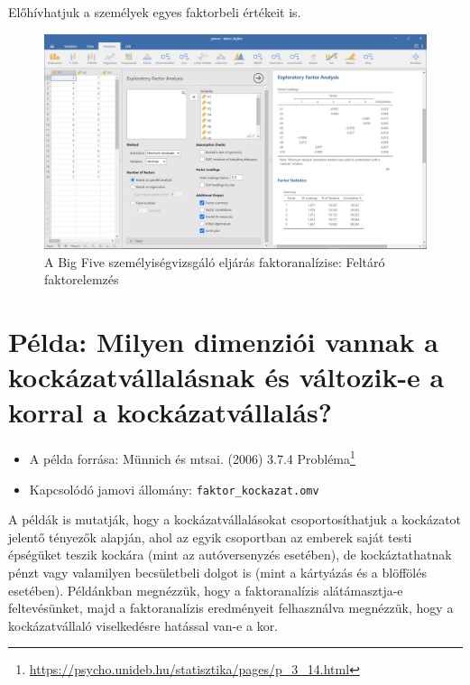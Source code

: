 \documentclass[
  letterpaper,
]{krantz}
\providecommand{\tightlist}{%
  \setlength{\itemsep}{0pt}\setlength{\parskip}{0pt}}\usepackage{longtable,booktabs,array}
\renewcommand{\href}[2]{#2\footnote{\url{#1}}}
\begin{document}
Előhívhatjuk a személyek egyes faktorbeli értékeit is.

\begin{figure}

{\centering \includegraphics{./images/faktor_bigfive_kep_01.jpg}

}

\caption{A Big Five személyiségvizsgáló eljárás faktoranalízise: Feltáró
faktorelemzés}

\end{figure}

\hypertarget{puxe9lda-milyen-dimenziuxf3i-vannak-a-kockuxe1zatvuxe1llaluxe1snak-uxe9s-vuxe1ltozik-e-a-korral-a-kockuxe1zatvuxe1llaluxe1s}{%
\section{Példa: Milyen dimenziói vannak a kockázatvállalásnak és
változik-e a korral a
kockázatvállalás?}\label{puxe9lda-milyen-dimenziuxf3i-vannak-a-kockuxe1zatvuxe1llaluxe1snak-uxe9s-vuxe1ltozik-e-a-korral-a-kockuxe1zatvuxe1llaluxe1s}}

\begin{itemize}
\tightlist
\item
  A példa forrása: Münnich és mtsai. (2006)
  \href{https://psycho.unideb.hu/statisztika/pages/p_3_14.html}{3.7.4
  Probléma}
\item
  Kapcsolódó jamovi állomány: \texttt{faktor\_kockazat.omv}
\end{itemize}

A példák is mutatják, hogy a kockázatvállalásokat csoportosíthatjuk a
kockázatot jelentő tényezők alapján, ahol az egyik csoportban az emberek
saját testi épségüket teszik kockára (mint az autóversenyzés esetében),
de kockáztathatnak pénzt vagy valamilyen becsületbeli dolgot is (mint a
kártyázás és a blöffölés esetében). Példánkban megnézzük, hogy a
faktoranalízis alátámasztja-e feltevésünket, majd a faktoranalízis
eredményeit felhasználva megnézzük, hogy a kockázatvállaló viselkedésre
hatással van-e a kor.
\end{document}
